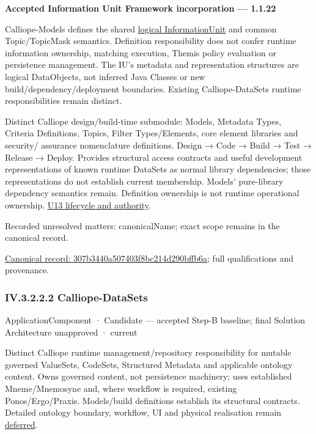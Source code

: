 \par\medskip\textbf{Accepted Information Unit Framework incorporation — 1.1.22}\par


Calliope-Models defines the shared \hyperref[element:74ec609de1ae498fbf9d13e4ef8c6cbe]{logical InformationUnit} and common Topic/TopicMask semantics. Definition responsibility does not confer runtime information ownership, matching execution, Themis policy evaluation or persistence management. The IU's metadata and representation structures are logical DataObjects, not inferred Java Classes or new build/dependency/deployment boundaries. Existing Calliope-DataSets runtime responsibilities remain distinct.



Distinct Calliope design/build-time submodule: Models, Metadata Types, Criteria
Definitions, Topics, Filter Types/Elements, core element libraries and security/
assurance nomenclature definitions. Design → Code → Build → Test → Release → Deploy.
Provides structural access contracts and useful development representations of
known runtime DataSets as normal library dependencies; those representations do
not establish current membership. Models' pure-library dependency semantics remain.
Definition ownership is not runtime operational ownership. \hyperref[element:307b3440a507403f8bc214d290bffb6a]{U13 lifecycle and authority}.


{\small Recorded unresolved matters: canonicalName; exact scope remains in the canonical record.}\par
{\footnotesize \href{../../../../../../../continuum/application/application-component/307b3440a507403f8bc214d290bffb6a.md}{Canonical record: 307b3440a507403f8bc214d290bffb6a}; full qualifications and provenance.}\par
\subsubsection*{IV.3.2.2.2 Calliope-DataSets}
\label{navigation:IV.3.2.2.2}

\label{element:53bf6815c7a54ed0abde9b1aad311843}
{\small ApplicationComponent · Candidate — accepted Step-B baseline; final Solution Architecture unapproved · current}\par

Distinct Calliope runtime management/repository responsibility for mutable governed
ValueSets, CodeSets, Structured Metadata and applicable ontology content. Owns
governed content, not persistence machinery; uses established Mneme/Mnemosyne and,
where workflow is required, existing Ponos/Ergo/Praxis. Models/build definitions
establish its structural contracts. Detailed ontology boundary, workflow, UI and
physical realisation remain \hyperref[element:466ad8f75a954c0581b5bba090443849]{deferred}.


